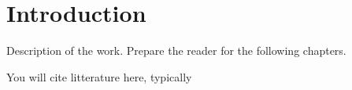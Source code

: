\chapter{Introduction} 

Description of the work. Prepare the reader for the following chapters.

You will cite litterature here, typically

